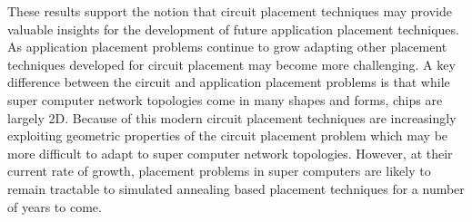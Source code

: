 		These results support the notion that circuit placement techniques may
		provide valuable insights for the development of future application
		placement techniques. As application placement problems continue to grow
		adapting other placement techniques developed for circuit placement may
		become more challenging. A key difference between the circuit and
		application placement problems is that while super computer network
		topologies come in many shapes and forms, chips are largely 2D.  Because of
		this modern circuit placement techniques are increasingly exploiting
		geometric properties of the circuit placement problem which may be more
		difficult to adapt to super computer network topologies.  However, at their
		current rate of growth, placement problems in super computers are likely to
		remain tractable to simulated annealing based placement techniques for a
		number of years to come. 

